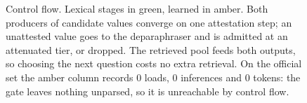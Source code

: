 \documentclass[11pt,a4paper]{article}
\begin{document}
\begin{figure}[H]
\caption{Control flow. Lexical stages in green, learned in amber. Both producers of
candidate values converge on one attestation step; an unattested value goes to the
deparaphraser and is admitted at an attenuated tier, or dropped. The retrieved pool feeds
both outputs, so choosing the next question costs no extra retrieval. On the official set
the amber column records 0 loads, 0 inferences and 0 tokens: the gate leaves nothing
unparsed, so it is unreachable by control flow.}
\end{figure}
\end{document}
